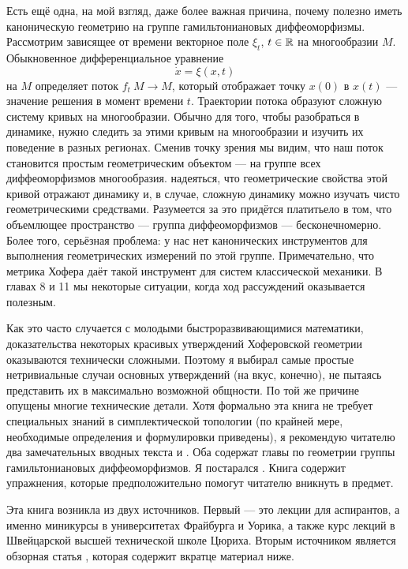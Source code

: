 Есть ещё одна, на мой взгляд, даже более важная причина, почему полезно иметь каноническую геометрию на группе гамильтониановых диффеоморфизмы.
Рассмотрим зависящее от времени векторное поле $\xi_t$, $t\in \mathbb{R}$ на многообразии $M$.
Обыкновенное дифференциальное уравнение
\[\dot x=\xi(x,t)\]
на $M$ определяет поток $f_t\: M \to M$, который отображает точку $x(0)$ в $x(t)$ --- значение решения в момент времени $t$.
Траектории потока образуют сложную систему кривых на многообразии.
Обычно для того, чтобы разобраться в динамике, нужно следить за этими кривым на многообразии и изучить их поведение в разных регионах.
Сменив точку зрения мы видим, что наш поток становится простым
геометрическим объектом ---  на группе всех диффеоморфизмов многообразия.
 надеяться, что геометрические свойства этой кривой отражают динамику и, в  случае, сложную динамику можно изучать чисто геометрическими средствами.
Разумеется за это придётся платитьело в том, что объемлющее пространство --- группа
диффеоморфизмов --- бесконечномерно.
Более того,  серьёзная проблема:
 у нас нет канонических инструментов для выполнения геометрических измерений по этой группе.
Примечательно, что метрика Хофера даёт такой инструмент для систем классической механики.
В главах 8 и 11 мы  некоторые ситуации,
когда  ход рассуждений оказывается полезным.

Как это часто случается с молодыми быстроразвивающимися  математики, доказательства некоторых красивых утверждений Хоферовской геометрии оказываются технически сложными.
Поэтому я выбирал самые простые нетривиальные случаи основных утверждений (на  вкус, конечно), не пытаясь представить их в максимально возможной общности.
По той же причине опущены многие технические детали.
Хотя формально эта книга не требует специальных знаний в симплектической топологии (по крайней мере, необходимые определения и формулировки приведены), я рекомендую читателю  два замечательных вводных текста \cite{HZ} и \cite{MS}.
Оба содержат главы по геометрии группы гамильтониановых диффеоморфизмов.
Я постарался .
Книга содержит упражнения, которые предположительно помогут читателю вникнуть в предмет.

Эта книга возникла из двух источников.
Первый --- это лекции для аспирантов, а именно миникурсы в университетах Фрайбурга и Уорика, а также курс лекций в Швейцарской высшей технической школе Цюриха.
Вторым источником является обзорная статья \cite{P8}, которая содержит
вкратце материал  ниже.

